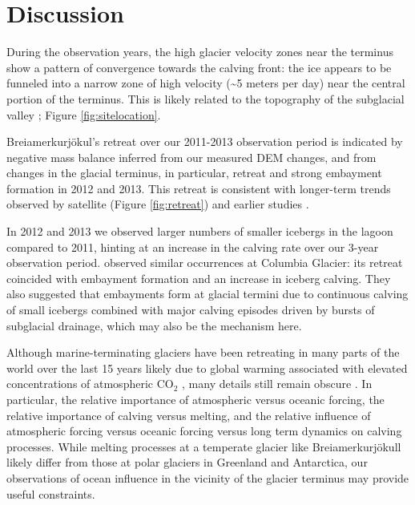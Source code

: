 \documentclass[review]{igs}
\begin{document}
   





\section{Discussion}

During the observation years, the high glacier velocity zones near the terminus show a pattern of convergence towards the calving front: the ice appears to be funneled into a narrow zone of high velocity (\textasciitilde5 meters per day) near the central portion of the terminus. This is likely related to the topography of the subglacial valley \citep{bjornsson1996scales};  Figure \ref{fig:sitelocation}.

Brei{\dh}amerkurjökul's retreat over our 2011-2013 observation period is indicated by negative mass balance inferred from our measured DEM changes, and from changes in the glacial terminus, in particular, retreat and strong embayment formation in 2012 and 2013.  This retreat is consistent with longer-term trends observed by satellite (Figure \ref{fig:retreat}) and earlier studies \citep{bjornsson2001jokulsarlon}.

In 2012 and 2013 we observed larger numbers of smaller icebergs in the lagoon compared to 2011, hinting at an increase in the calving rate over our 3-year observation period. \citet*{sikonia1979columbia} observed similar occurrences at Columbia Glacier: its retreat coincided with embayment formation and an increase in iceberg calving. They also suggested that embayments form at glacial termini due to continuous calving of small icebergs combined with major calving episodes driven by bursts of subglacial drainage, which may also be the mechanism here.

Although marine-terminating glaciers have been retreating in many parts of the world over the last 15 years likely due to global warming associated with elevated concentrations of atmospheric $\mathrm{CO}_2$ \citep{ipcc}, many details still remain obscure \citep{joughin2012ice}. In particular, the relative importance of atmospheric versus oceanic forcing, the relative importance of calving versus melting, and the relative influence of atmospheric forcing versus oceanic forcing versus long term dynamics on calving processes.  While melting processes at a temperate glacier like Brei{\dh}amerkurjökull likely differ from those at polar glaciers in Greenland and Antarctica, our observations of ocean influence in the vicinity of the glacier terminus may provide useful constraints.
\end{document}
